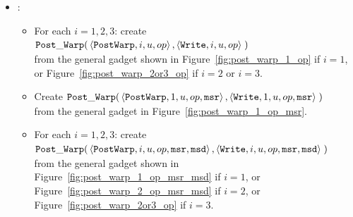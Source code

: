 \begin{itemize}
        \item {\postwarp}:
        \begin{itemize}
           \item For each $i = 1,2,3$: create\\
            $\begin{aligned}[t]
                \postwarp(& \left \langle {\tt PostWarp}, i, u, \inc \right\rangle,    %
                            \left \langle {\tt Write},    i, u, \inc \right\rangle \;) %
            \end{aligned}$ \\
            from the general gadget shown in Figure~\ref{fig:post_warp_1_op} if $i = 1$,
            or Figure~\ref{fig:post_warp_2or3_op} if $ i = 2$ or $i = 3$.
            \vspace{.5cm}


            \item Create
            $\begin{aligned}[t]
                \postwarp(& \left \langle {\tt PostWarp}, 1, u, \inc, {\tt msr} \right\rangle,    %
                            \left \langle {\tt Write},    1, u, \inc, {\tt msr} \right\rangle \;) %
            \end{aligned}$ \\
            from the general gadget in Figure~\ref{fig:post_warp_1_op_msr}.
            \vspace{.5cm}

            \item For each $i=1,2,3$: create\\
            $\begin{aligned}[t]
                \postwarp(& \left \langle {\tt PostWarp}, i, u, \inc, {\tt msr}, {\tt msd} \right\rangle,    %
                            \left \langle {\tt Write},    i, u, \inc, {\tt msr}, {\tt msd} \right\rangle \;) %
            \end{aligned}$ \\
            from the general gadget shown in Figure~\ref{fig:post_warp_1_op_msr_msd} if $i = 1$, or
            Figure~\ref{fig:post_warp_2_op_msr_msd} if $i = 2$, or Figure~\ref{fig:post_warp_2or3_op} if $i = 3$.
            \vspace{.5cm}

        \end{itemize}


\end{itemize}
